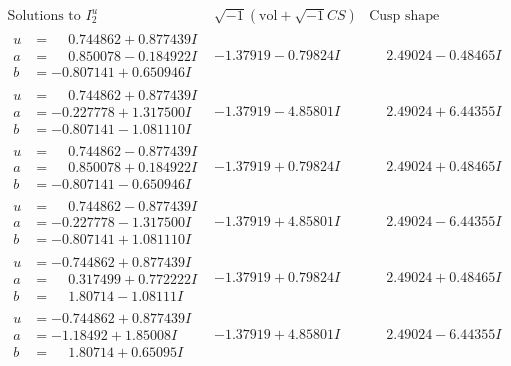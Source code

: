 \documentclass[1p]{elsarticle_modified}
\theoremstyle{definition}
\newcommand{\I}{\sqrt{-1}}
\begin{document}
$$\begin{array}{c|c|c}  
\text{Solutions to }I^u_{2}& \I (\text{vol} + \sqrt{-1}CS) & \text{Cusp shape}\\
 \hline 
\begin{aligned}
u &= \phantom{-}0.744862 + 0.877439 I \\
a &= \phantom{-}0.850078 - 0.184922 I \\
b &= -0.807141 + 0.650946 I\end{aligned}
 & -1.37919 - 0.79824 I & \phantom{-}2.49024 - 0.48465 I \\ \hline\begin{aligned}
u &= \phantom{-}0.744862 + 0.877439 I \\
a &= -0.227778 + 1.317500 I \\
b &= -0.807141 - 1.081110 I\end{aligned}
 & -1.37919 - 4.85801 I & \phantom{-}2.49024 + 6.44355 I \\ \hline\begin{aligned}
u &= \phantom{-}0.744862 - 0.877439 I \\
a &= \phantom{-}0.850078 + 0.184922 I \\
b &= -0.807141 - 0.650946 I\end{aligned}
 & -1.37919 + 0.79824 I & \phantom{-}2.49024 + 0.48465 I \\ \hline\begin{aligned}
u &= \phantom{-}0.744862 - 0.877439 I \\
a &= -0.227778 - 1.317500 I \\
b &= -0.807141 + 1.081110 I\end{aligned}
 & -1.37919 + 4.85801 I & \phantom{-}2.49024 - 6.44355 I \\ \hline\begin{aligned}
u &= -0.744862 + 0.877439 I \\
a &= \phantom{-}0.317499 + 0.772222 I \\
b &= \phantom{-}1.80714 - 1.08111 I\end{aligned}
 & -1.37919 + 0.79824 I & \phantom{-}2.49024 + 0.48465 I \\ \hline\begin{aligned}
u &= -0.744862 + 0.877439 I \\
a &= -1.18492 + 1.85008 I \\
b &= \phantom{-}1.80714 + 0.65095 I\end{aligned}
 & -1.37919 + 4.85801 I & \phantom{-}2.49024 - 6.44355 I \\ \hline\begin{aligned}

\end{aligned}
\end{array}$$
\end{document}
